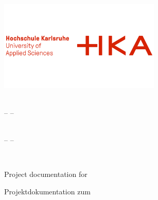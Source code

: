 \thispagestyle{empty}

\begin{titlepage}
	
	\vspace*{-2,5cm}
  	\begin{center}
    		\includegraphics[width=7.7cm]{Figures/png/HKA_Logo.png} \\ 
  	\end{center}

	\ifdefined\ThesisLanguageIsEnglish
		\begin{center}
			\vspace{0.1cm}
			\LARGE \textbf{\University}\\
			\vspace{0.4cm}
			\Large -- \FacultyEN --
		\end{center}
	\else
  		\begin{center}
			\vspace{0.1cm}
			\LARGE \textbf{\University}\\
			\vspace{0.4cm}
			\Large -- \FacultyDE --
		\end{center}
	\fi
	
	\vfill
	
	\begin{center}
		\huge \textbf{\ThesisTitle}\\
		\vspace{0.4cm}
		\LARGE \ThesisSubtitle
	\end{center}
	
	\vfill
	
	\ifdefined\ThesisLanguageIsEnglish
		\begin{center}
			\Large Project documentation for\\
			\vspace{0.3cm}
			\Large \Subject
		\end{center}
	\else
		\begin{center}
			\Large Projektdokumentation zum\\
			\vspace{0.3cm}
			\Large \Subject   %
		\end{center}
	\fi
	

\end{titlepage}
